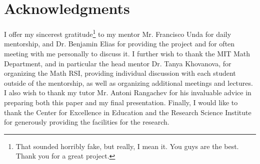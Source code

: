 \section{Acknowledgments} 
I offer my sincerest gratitude\footnote{That sounded horribly fake, but really, I mean it.  You guys are the best.  Thank you for a great project.} to my mentor Mr. Francisco Unda for daily mentorship, and Dr. Benjamin Elias for providing the project and for often meeting with me personally to discuss it.
I further wish to thank the MIT Math Department, and in particular the head mentor Dr. Tanya Khovanova, for organizing the Math RSI, providing individual discussion with each student outside of the mentorship, as well as organizing additional meetings and lectures.
I also wish to thank my tutor Mr. Antoni Rangachev for his invaluable advice in preparing both this paper and my final presentation.
Finally, I would like to thank the Center for Excellence in Education and the Research Science Institute for generously providing the facilities for the research.


